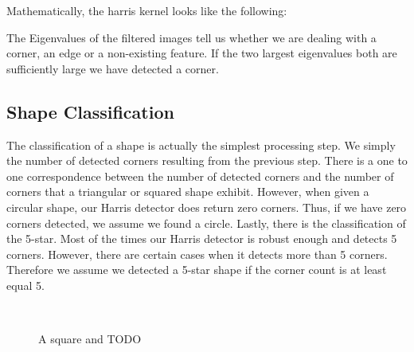\documentclass[conference]{IEEEtran}
\begin{document}
Mathematically, the harris kernel looks like the following: 

The Eigenvalues of the filtered images tell us whether we are dealing with a corner, an edge or a non-existing feature. If the two largest eigenvalues both are sufficiently large we have detected a corner.

\subsection{Shape Classification}
The classification of a shape is actually the simplest processing step. We simply the number of detected corners resulting from the previous step. There is a one to one correspondence between the number of detected corners and the number of corners that a triangular or squared shape exhibit. However, when given a circular shape, our Harris detector does return zero corners. Thus, if we have zero corners detected, we assume we found a circle. Lastly, there is the classification of the 5-star. Most of the times our Harris detector is robust enough and detects 5 corners. However, there are certain cases when it detects more than 5 corners. Therefore we assume we detected a 5-star shape if the corner count is at least equal 5.


\begin{figure}%
\centering
{}
\\
\caption{A square and TODO}

\end{figure}
\end{document}
